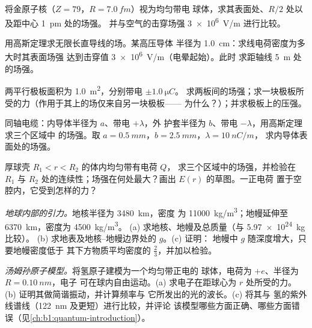 \begin{exercise}[$\star\star$]\label{exo:b1:electrostatics-gauss:6}
将金原子核（$Z = 79$，$R = \qty{7.0}{fm}$）视为均匀带电
球体，求其表面处、$R/2$ 处以及距中心 \qty{1}{pm} 处的场强。
并与空气的击穿场强 \qty{3e6}{V/m} 进行比较。
\end{exercise}

\begin{exercise}[$\star\star$]\label{exo:b1:electrostatics-gauss:7}
用高斯定理求无限长直导线的场。某高压导体
半径为 \qty{1.0}{cm}：求线电荷密度为多大时其表面场强
达到击穿值 \qty{3e6}{V/m}（电晕起始）。此时
求距轴线 \qty{5}{m} 处的场强。
\end{exercise}

\begin{exercise}[$\star\star$]\label{exo:b1:electrostatics-gauss:8}
两平行极板面积为 \qty{1.0}{m^2}，分别带电 $\pm\qty{1.0}{\micro C}$。
求两板间的场强；求一块极板所受的力（作用于其上的场仅来自另一块极板——
为什么？）；并求极板上的压强。
\end{exercise}

\begin{exercise}[$\star\star$]\label{exo:b1:electrostatics-gauss:9}
同轴电缆：内导体半径为 $a$、带电 $+\lambda$，外
护套半径为 $b$、带电 $-\lambda$，用高斯定理求三个区域中
的场强。取 $a = \qty{0.5}{mm}$，$b = \qty{2.5}{mm}$，$\lambda = \qty{10}{nC/m}$，
求内导体表面处的场强。
\end{exercise}

\begin{exercise}[$\star\star\star$]\label{exo:b1:electrostatics-gauss:10}
厚球壳 $R_1 < r < R_2$ 的体内均匀带有电荷 $Q$，
求三个区域中的场强，并检验在 $R_1$
与 $R_2$ 处的连续性；场强在何处最大？画出 $E(r)$ 的草图。一正电荷
置于空腔内，它受到怎样的力？
\end{exercise}

\begin{exercise}[$\star\star\star$]\label{exo:b1:electrostatics-gauss:11}
\emph{地球内部的引力。}地核半径为 \qty{3480}{km}，密度
为 \qty{11000}{kg/m^3}；地幔延伸至 \qty{6370}{km}，密度为 \qty{4500}{kg/m^3}。
(a) 求地核、地幔及总质量（与 \qty{5.97e24}{kg} 比较）。
(b) 求地表及地核–地幔边界处的 $g$。(c) 证明：
地幔中 $g$ 随深度增大，只要地幔密度低于
其下方物质平均密度的 $\tfrac23$，并加以检验。
\end{exercise}

\begin{exercise}[$\star\star\star$]\label{exo:b1:electrostatics-gauss:12}
\emph{汤姆孙原子模型。}将氢原子建模为一个均匀带正电的
球体，电荷为 $+e$、半径为 $R = \qty{0.10}{nm}$，电子
可在球内自由运动。(a) 求电子在距球心为 $r$ 处所受的力。
(b) 证明其做简谐振动，并计算频率与
它所发出的光的波长。(c) 将其与
氢的紫外线谱线（\qty{122}{nm} 及更短）进行比较，并评论
该模型哪些方面正确、哪些方面错误（见\cref{ch:b1:quantum-introduction}）。
\end{exercise}

